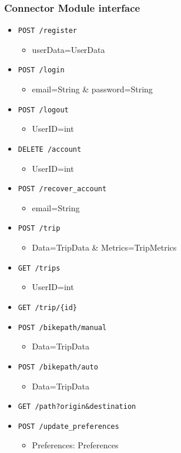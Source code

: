 \documentclass{Configuration_Files/PoliMi3i_thesis}
\begin{document}
\subsubsection{Connector Module interface}
\begin{itemize}
    \item \texttt{POST /register}
    \begin{itemize}
        \item{userData=UserData}
    \end{itemize}
    \item \texttt{POST /login}
    \begin{itemize}
        \item{email=String \& password=String}
    \end{itemize}
    \item \texttt{POST /logout}
    \begin{itemize}
        \item{UserID=int}
    \end{itemize}
    \item \texttt{DELETE /account}
    \begin{itemize}
        \item{UserID=int}
    \end{itemize}
    \item \texttt{POST /recover\_account}
    \begin{itemize}
        \item{email=String}
    \end{itemize}
    \item \texttt{POST /trip}
    \begin{itemize}
        \item{Data=TripData \& Metrics=TripMetrics}
    \end{itemize}
    \item \texttt{GET /trips}
    \begin{itemize}
        \item{UserID=int}
    \end{itemize}
    \item \texttt{GET /trip/\{id\}}
    \item \texttt{POST /bikepath/manual}
    \begin{itemize}
        \item{Data=TripData}
    \end{itemize}
    \item \texttt{POST /bikepath/auto}
    \begin{itemize}
        \item{Data=TripData}
    \end{itemize}
    \item \texttt{GET /path?origin\&destination}    

    \item \texttt{POST /update\_preferences}
    \begin{itemize}
        \item{Preferences: Preferences}
    \end{itemize}
    
\end{itemize}
\end{document}
